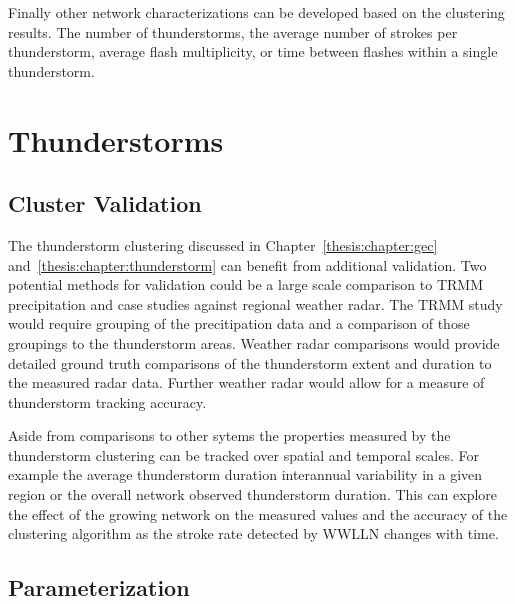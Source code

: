 Finally other network characterizations can be developed based on the clustering results.
The number of thunderstorms, the average number of strokes per thunderstorm, average flash multiplicity, or time between flashes within a single thunderstorm.

\section{Thunderstorms}

\subsection{Cluster Validation}

The thunderstorm clustering discussed in Chapter~\ref{thesis:chapter:gec} and~\ref{thesis:chapter:thunderstorm} can benefit from additional validation.
Two potential methods for validation could be a large scale comparison to TRMM precipitation and case studies against regional weather radar.
The TRMM study would require grouping of the precitipation data and a comparison of those groupings to the thunderstorm areas.
Weather radar comparisons would provide detailed ground truth comparisons of the thunderstorm extent and duration to the measured radar data.
Further weather radar would allow for a measure of thunderstorm tracking accuracy.

Aside from comparisons to other sytems the properties measured by the thunderstorm clustering can be tracked over spatial and temporal scales.
For example the average thunderstorm duration interannual variability in a given region or the overall network observed thunderstorm duration.
This can explore the effect of the growing network on the measured values and the accuracy of the clustering algorithm as the stroke rate detected by WWLLN changes with time.

\subsection{Parameterization}

